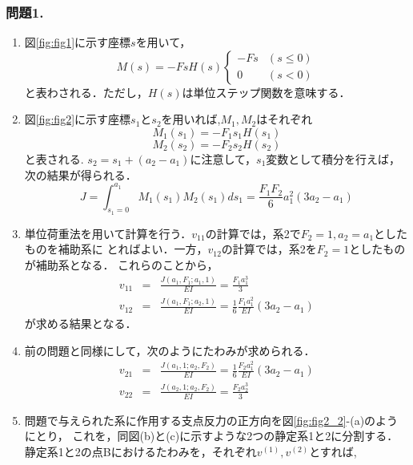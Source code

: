 \documentclass[10pt,a4j]{jarticle}
\begin{document}
\subsubsection*{問題1.}
\begin{enumerate}
\item
	図\ref{fig:fig1}に示す座標$s$を用いて，
	\begin{equation}
	M(s)=-FsH(s)\left\{
		\begin{array}{cc}
			-Fs & (s\leq 0) \\
			0 & (s<0)
		\end{array}
	\right.
	\label{eqn:}
	\end{equation}
	と表わされる．ただし，$H(s)$は単位ステップ関数を意味する．
\item
	図\ref{fig:fig2}に示す座標$s_1$と$s_2$を用いれば,$M_1,M_2$はそれぞれ
	\begin{equation}
		M_1(s_1)= -F_1s_1H(s_1)
	\end{equation}
	\begin{equation}
		M_2(s_2)= -F_2s_2H(s_2)
	\end{equation}
	と表される. $s_2=s_1+(a_2-a_1)$に注意して，$s_1$変数として積分を行えば，
	次の結果が得られる．
	\begin{equation}
		J=\int_{s_1=0}^{a_1} M_1(s_1)M_2(s_1)ds_1=\frac{F_1F_2}{6}a_1^2(3a_2-a_1)
		\label{eqn:}
	\end{equation}
\item
	単位荷重法を用いて計算を行う．$v_{11}$の計算では，系2で$F_2=1,a_2=a_1$としたものを補助系に
	とればよい．一方，$v_{12}$の計算では，系2を$F_2=1$としたものが補助系となる．
	これらのことから，
	\begin{eqnarray}
		v_{11}&=& \frac{J(a_1,F_1;a_1,1)}{EI}=\frac{F_1a_1^3}{3} \\
		v_{12}&=& \frac{J(a_1,F_1;a_2,1)}{EI}=\frac{1}{6}\frac{F_1a_1^2}{EI}(3a_2-a_1) 
	\end{eqnarray}
	が求める結果となる．
\item
	前の問題と同様にして，次のようにたわみが求められる．
	\begin{eqnarray}
		v_{21}&=& \frac{J(a_1,1;a_2,F_2)}{EI}=\frac{1}{6}\frac{F_2a_1^2}{EI}(3a_2-a_1) \\
		v_{22}&=& \frac{J(a_2,1;a_2,F_2)}{EI}=\frac{F_2a_2^3}{3} 
	\end{eqnarray}
\item
	問題で与えられた系に作用する支点反力の正方向を図\ref{fig:fig2_2}-(a)のようにとり，
	これを，同図(b)と(c)に示すような2つの静定系1と2に分割する．
	静定系1と2の点Bにおけるたわみを，それぞれ$v^{(1)},v^{(2)}$とすれば,

\end{enumerate}
\end{document}
